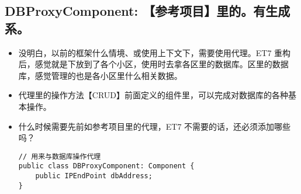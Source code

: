 \documentclass[9pt, b5paper]{article}
\begin{document}
\subsection{DBProxyComponent: 【参考项目】里的。有生成系。}
\label{sec-4-6}
\begin{itemize}
\item 没明白，以前的框架什么情境、或使用上下文下，需要使用代理。ET7 重构后，感觉就是下放到了各个小区，使用时去拿各区里的数据库。区里的数据库，感觉管理的也是各小区里什么相关数据。
\item 代理里的操作方法【CRUD】前面定义的组件里，可以完成对数据库的各种基本操作。
\item 什么时候需要先前如参考项目里的代理，ET7 不需要的话，还必须添加哪些吗？
\begin{verbatim}
// 用来与数据库操作代理
public class DBProxyComponent: Component {
    public IPEndPoint dbAddress;
}
\end{verbatim}
\end{itemize}
\end{document}
